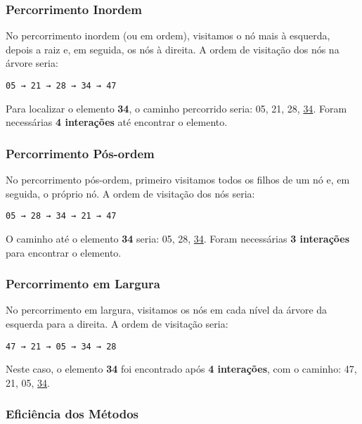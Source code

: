 \documentclass{article}
\begin{document}
\subsubsection{Percorrimento Inordem}

No percorrimento inordem (ou em ordem), visitamos o nó mais à esquerda, depois a raiz e, em seguida, os nós à direita. A ordem de visitação dos nós na árvore seria:

\begin{verbatim}
05 → 21 → 28 → 34 → 47
\end{verbatim}

\noindent
Para localizar o elemento \textbf{34}, o caminho percorrido seria: 05, 21, 28, \underline{34}. Foram necessárias \textbf{4 interações} até encontrar o elemento.

\subsubsection{Percorrimento Pós-ordem}

No percorrimento pós-ordem, primeiro visitamos todos os filhos de um nó e, em seguida, o próprio nó. A ordem de visitação dos nós seria:

\begin{verbatim}
05 → 28 → 34 → 21 → 47
\end{verbatim}

\noindent
O caminho até o elemento \textbf{34} seria: 05, 28, \underline{34}. Foram necessárias \textbf{3 interações} para encontrar o elemento.

\subsubsection{Percorrimento em Largura}

No percorrimento em largura, visitamos os nós em cada nível da árvore da esquerda para a direita. A ordem de visitação seria:

\begin{verbatim}
47 → 21 → 05 → 34 → 28
\end{verbatim}

\noindent
Neste caso, o elemento \textbf{34} foi encontrado após \textbf{4 interações}, com o caminho: 47, 21, 05, \underline{34}.

\subsubsection{Eficiência dos Métodos}
\end{document}
